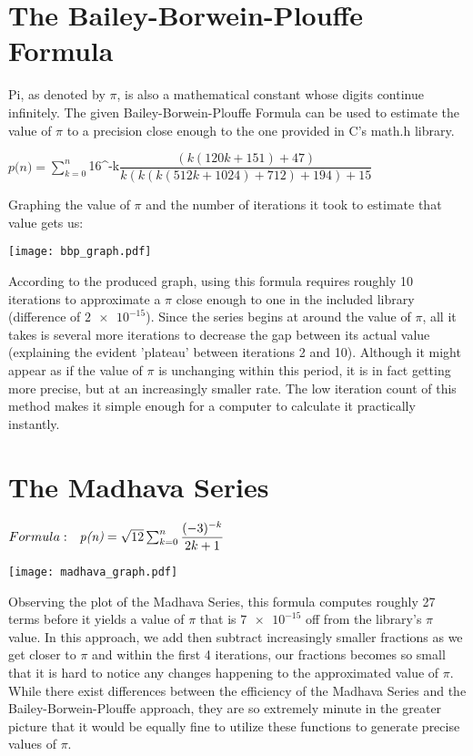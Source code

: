 \documentclass[12pt]{article}
\begin{document}
\section{The Bailey-Borwein-Plouffe Formula}

\normalsize
Pi, as denoted by $\pi$, is also a mathematical constant whose digits continue infinitely. The given Bailey-Borwein-Plouffe Formula can be used to estimate the value of $\pi$ to a precision close enough to the one provided in C's math.h library.

\centering
$
\textit{p(n)} = \sum^{n}_{k=0} $16^{-k}$ {\dfrac{(k(120k+151)+47)}{k(k(k(512k+1024)+712)+194)+15}}
$
\flushleft

Graphing the value of \textit{$\pi$} and the number of iterations it took to estimate that value gets us:

\texttt{[image: bbp\_graph.pdf]}

According to the produced graph, using this formula requires roughly 10 iterations to approximate a $\pi$ close enough to one in the included library (difference of $\num{2e-15}$). Since the series begins at around the value of $\pi$, all it takes is several more iterations to decrease the gap between its actual value (explaining the evident 'plateau' between iterations 2 and 10). Although it might appear as if the value of $\pi$ is unchanging within this period, it is in fact getting more precise, but at an increasingly smaller rate. The low iteration count of this method makes it simple enough for a computer to calculate it practically instantly.

\vspace{4in}
\section{The Madhava Series}
\normalsize

\centering
$
Formula: \hspace{0.25cm} \textit{p(n)} = \sqrt{12}\sum^{n}_{k=0}\dfrac{(-3)^{-k}}{2k+1}
$

\texttt{[image: madhava\_graph.pdf]}
\flushleft

Observing the plot of the Madhava Series, this formula computes roughly 27 terms before it yields a value of $\pi$ that is $\num{7e-15}$ off from the library's $\pi$ value. In this approach, we add then subtract increasingly smaller fractions as we get closer to $\pi$ and within the first 4 iterations, our fractions becomes so small that it is hard to notice any changes happening to the approximated value of $\pi$. While there exist differences between the efficiency of the Madhava Series and the Bailey-Borwein-Plouffe approach, they are so extremely minute in the greater picture that it would be equally fine to utilize these functions to generate precise values of $\pi$.
\end{document}
